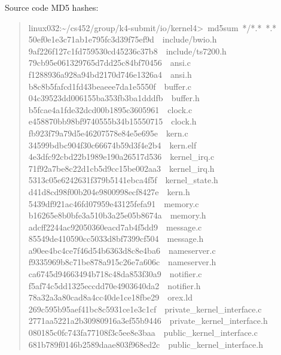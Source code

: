 \documentclass[letterpaper]{article}
\begin{document}
Source code MD5 hashes:
%
\begin{quote}{\ttfamily \raggedright \noindent
linux032:\textasciitilde{}/cs452/group/k4-submit/io/kernel4>~md5sum~*/*.*~*.*\\
50ef0e1e3c71ab1e795fc3d39f75ef9d~~include/bwio.h\\
9af226f127c1fd759530cd45236c37b8~~include/ts7200.h\\
79cb95e061329765d7dd25c84bf70456~~ansi.c\\
f1288936a928a94bd2170d746e1326a4~~ansi.h\\
b8c8b5fafcd1fd43beaeee7da1e5550f~~buffer.c\\
04c39523dd006155ba353fb3ba1dddfb~~buffer.h\\
b5fcae4a1fde32dcd00b1895c3605961~~clock.c\\
e458870bb98bf9740555b34b15550715~~clock.h\\
fb923f79a79d5e46207578e84e5e695e~~kern.c\\
34599bdbc904f30c66674b59d3f4e2b4~~kern.elf\\
4e3dfc92cbd22b1989e190a26517d536~~kernel\_irq.c\\
71f92a7be8c22d1cb5d9cc15be002aa3~~kernel\_irq.h\\
5313c05e6242631f379b5141ebca4f5f~~kernel\_state.h\\
d41d8cd98f00b204e9800998ecf8427e~~kern.h\\
5439df921ac46fd07959e43125fefa91~~memory.c\\
b16265e8b0bfe3a510b3a25e05b8674a~~memory.h\\
adcff2244ac92050360eacd7ab4f5dd9~~message.c\\
85549de410590cc5033d8bf7399cf504~~message.h\\
a90ee4bc4ce7f46d54b6363d8c8e4ba6~~nameserver.c\\
f9335969b8c71be878a915c26e7a606c~~nameserver.h\\
ca6745d94663494b718c48da853f30a9~~notifier.c\\
f5af74c5dd1325eccdd70e4903640da2~~notifier.h\\
78a32a3a80cad8a4cc40de1ce18fbe29~~orex.ld\\
269c595b95aef41bc8c5931ce1e3c1cf~~private\_kernel\_interface.c\\
2771aa5221a2b30980916a3ef55b9446~~private\_kernel\_interface.h\\
080185c0fc743fa77108f3c5ee8e3baa~~public\_kernel\_interface.c\\
681b789f0146b2589daae803f968ed2c~~public\_kernel\_interface.h\\
}
\end{quote}
\end{document}
